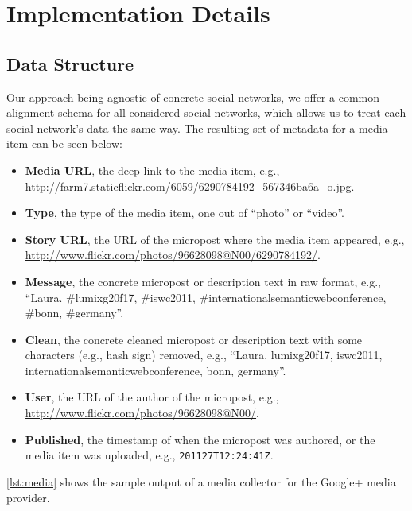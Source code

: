 \documentclass{acm_proc_article-sp}
\newcommand{\inlinelistingsize}{\fontsize{8pt}{11pt}}
\let\oldurl\url
\renewcommand{\url}[1]{\inlinelistingsize\oldurl{#1}}
\begin{document}
\section{Implementation Details}

\subsection{Data Structure}
Our approach being agnostic of concrete social networks, we offer a common alignment schema for all considered social networks, which allows us to treat each social network's data the same way.
The resulting set of metadata for a media item can be seen below:
\begin{itemize}
  \item	\textbf{Media URL}, the deep link to the media item, e.g., \url{http://farm7.staticflickr.com/6059/6290784192_567346ba6a_o.jpg}.
  \item \textbf{Type}, the type of the media item, one out of ``photo'' or ``video''.
  \item \textbf{Story URL}, the URL of the micropost where the media item appeared, e.g., \url{http://www.flickr.com/photos/96628098@N00/6290784192/}.
  \item \textbf{Message}, the concrete micropost or description text in raw format, e.g., ``Laura. \#lumixg20f17, \#iswc2011, \#internationalsemanticwebconference, \#bonn, \#germany''.
  \item \textbf{Clean}, the concrete cleaned micropost or description text with some characters (e.g., hash sign) removed, e.g., ``Laura. lumixg20f17, iswc2011, internationalsemanticwebconference, bonn, germany''.
  \item \textbf{User}, the URL of the author of the micropost, e.g., \url{http://www.flickr.com/photos/96628098@N00/}.
  \item \textbf{Published}, the timestamp of when the micropost was authored, or the media item was uploaded, e.g., \texttt{2011\-27T12:24:41Z}.
\end{itemize}

\autoref{lst:media} shows the sample output of a media collector for the Google+ media provider.
\end{document}
